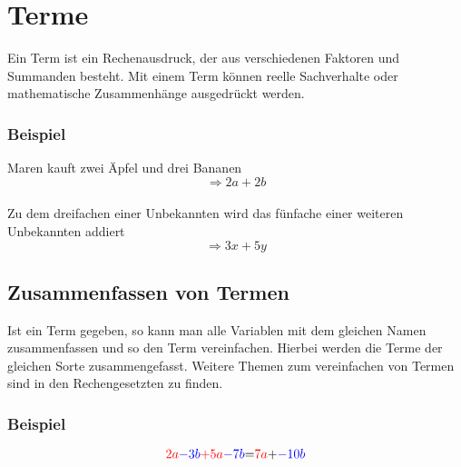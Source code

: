 \section{Terme}
Ein Term ist ein Rechenausdruck, der aus verschiedenen Faktoren und Summanden besteht. Mit einem Term können reelle Sachverhalte oder mathematische Zusammenhänge ausgedrückt werden.
\subsubsection{Beispiel}
Maren kauft zwei Äpfel und drei Bananen
\[\Rightarrow2a+2b\]
\\
Zu dem dreifachen einer Unbekannten wird das fünfache einer weiteren Unbekannten addiert
\[\Rightarrow 3x+5y\]

\subsection{Zusammenfassen von Termen}
Ist ein Term gegeben, so kann man alle Variablen mit dem gleichen Namen zusammenfassen und so den Term vereinfachen. Hierbei werden die Terme der gleichen Sorte zusammengefasst. Weitere Themen zum vereinfachen von Termen sind in den Rechengesetzten zu finden.

\subsubsection{Beispiel}
\[\color{red}{2a}\color{blue}{-3b} \color{red}{+5a}\color{blue}{-7b}\color{black}{=}\color{red}{7a}\color{black}{+}\color{blue}{-10b} \]

